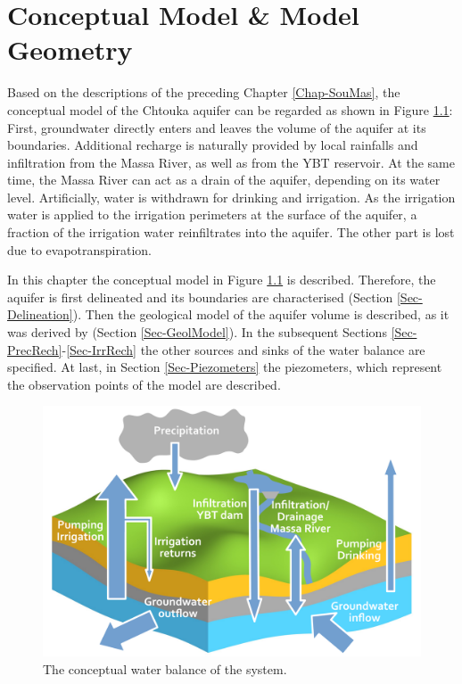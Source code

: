 
\chapter{Conceptual Model \& Model Geometry}
\label{Chap-ConcMod}

Based on the descriptions of the preceding Chapter \ref{Chap-SouMas}, the conceptual model of the Chtouka aquifer can be regarded as shown in Figure \ref{Fig-SchemeBalance}: First, groundwater directly enters and leaves the volume of the aquifer at its boundaries. 
Additional recharge is naturally provided by local rainfalls and infiltration from the Massa River, as well as from the YBT reservoir. 
At the same time, the Massa River can act as a drain of the aquifer, depending on its water level. 
Artificially, water is withdrawn for drinking and irrigation. 
As the irrigation water is applied to the irrigation perimeters at the surface of the aquifer, a fraction of the irrigation water reinfiltrates into the aquifer. 
The other part is lost due to evapotranspiration.

In this chapter the conceptual model in Figure \ref{Fig-SchemeBalance} is described. 
Therefore, the aquifer is first delineated and its boundaries are characterised (Section \ref{Sec-Delineation}). 
Then the geological model of the aquifer volume is described, as it was derived by \textcite{Horn.2021} (Section \ref{Sec-GeolModel}). 
In the subsequent Sections \ref{Sec-PrecRech}-\ref{Sec-IrrRech} the other sources and sinks of the water balance are specified. 
At last, in Section \ref{Sec-Piezometers} the piezometers, which represent the observation points of the model are described.

\begin{figure}[h]
    \centering
    \includegraphics[width=1.0\textwidth]{./img/Fig-SchematicBalanceSystem.pdf}
    \captionsetup{format=hang, labelfont=bf, textfont=it}
    \caption{The conceptual water balance of the system.}
    \label{Fig-SchemeBalance}
\end{figure}

